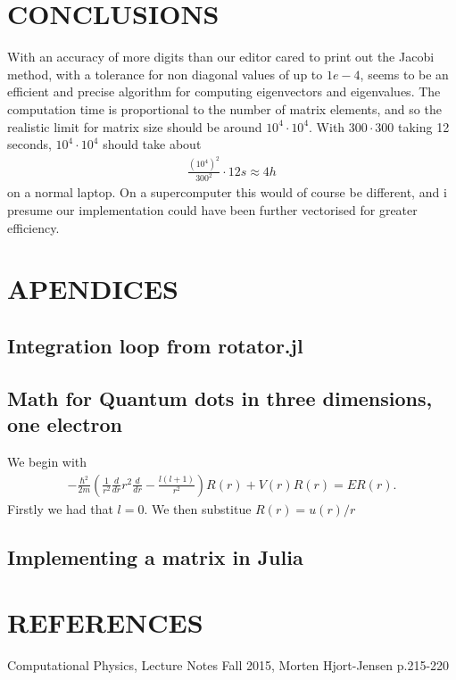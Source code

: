 \documentclass[a4paper]{article}
\begin{document}
\section{CONCLUSIONS}
With an accuracy of more digits than our editor cared to print out the Jacobi method, with a tolerance for non diagonal values of up to $1e-4$, seems to be an efficient and precise algorithm for computing eigenvectors and eigenvalues. The computation time is proportional to the number of matrix elements, and so the realistic limit for matrix size should be around $10^4 \cdot 10^4$. With $300 \cdot 300$ taking 12 seconds, $10^4 \cdot 10^4$ should take about
\begin{align}
\frac{(10^4)^2}{300^2}\cdot 12s\approx 4h
\end{align}
on a normal laptop. On a supercomputer this would of course be different, and i presume our implementation could have been further vectorised for greater efficiency.
\section{APENDICES}
\subsection{Integration loop from rotator.jl}\label{rotator.jl}


\subsection{Math for Quantum dots in three dimensions, one electron}\label{opp d math}
We begin with 
\begin{align}
- \frac{\hbar^2}{2m} \left( \frac{1}{r^2} \frac{d}{dr} r^2 \frac{d}{dr} - \frac{l(l+1)}{r^2}\right) R(r) + V(r) R(r) = ER(r).
\end{align}
Firstly we had that $l=0$. We then substitue $R(r) = u(r)/r$


\subsection{Implementing a matrix in Julia}\label{opp_d matrix}


\section{REFERENCES}
\begin{thebibliography}{9}
	Computational Physics, Lecture Notes Fall 2015, Morten Hjort-Jensen p.215-220
\end{thebibliography}




\end{document}

